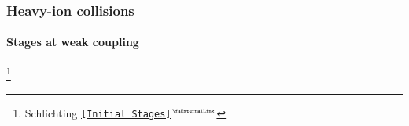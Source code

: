 \documentclass[aspectratio=169,11pt,usenames,dvipsnames]{beamer}
\renewcommand{\thefootnote}{\color{customblue}\faPaperPlaneO}
\newcommand\blfootnote[1]{%
  \begingroup
  \renewcommand\thefootnote{}\footnote{#1}%
  \addtocounter{footnote}{-1}%
  \endgroup
}
\begin{document}

\begin{frame}
    \frametitle{Heavy-ion collisions}
    \framesubtitle{Stages at weak coupling}

    \begin{center}
    \end{center}
        
    \blfootnote{\scriptsize Schlichting \href{https://indico.cern.ch/event/469857/contributions/1978347/attachments/1277798/1896654/SchlichtingIS2016.pdf}{{\color{palgold}\texttt{[Initial Stages]$^\text{\tiny\faExternalLink}$}}}}
\end{frame}


\end{document}
